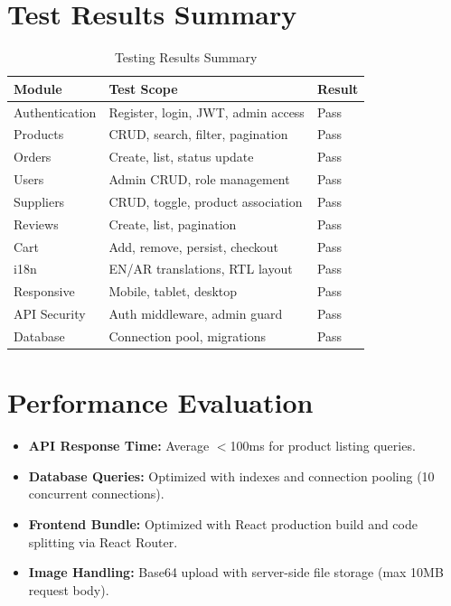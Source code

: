 \documentclass[12pt,a4paper]{report}
\begin{document}
\section{Test Results Summary}
\begin{table}[H]
\centering
\caption{Testing Results Summary}
\label{tab:testing}
\begin{tabularx}{\textwidth}{|l|X|l|}
\hline
\textbf{Module} & \textbf{Test Scope} & \textbf{Result} \\
\hline
Authentication & Register, login, JWT, admin access & Pass \\
Products & CRUD, search, filter, pagination & Pass \\
Orders & Create, list, status update & Pass \\
Users & Admin CRUD, role management & Pass \\
Suppliers & CRUD, toggle, product association & Pass \\
Reviews & Create, list, pagination & Pass \\
Cart & Add, remove, persist, checkout & Pass \\
i18n & EN/AR translations, RTL layout & Pass \\
Responsive & Mobile, tablet, desktop & Pass \\
API Security & Auth middleware, admin guard & Pass \\
Database & Connection pool, migrations & Pass \\
\hline
\end{tabularx}
\end{table}

\section{Performance Evaluation}
\begin{itemize}[noitemsep]
  \item \textbf{API Response Time:} Average $<$100ms for product listing queries.
  \item \textbf{Database Queries:} Optimized with indexes and connection pooling (10 concurrent connections).
  \item \textbf{Frontend Bundle:} Optimized with React production build and code splitting via React Router.
  \item \textbf{Image Handling:} Base64 upload with server-side file storage (max 10MB request body).
\end{itemize}


\end{document}
